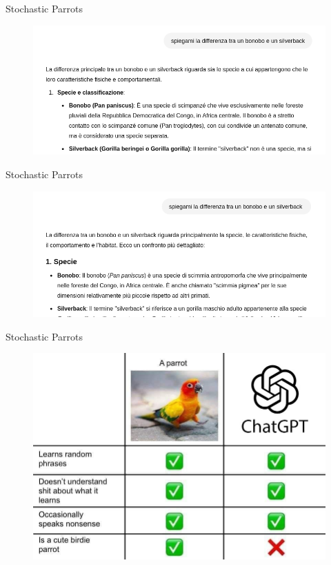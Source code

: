 \documentclass{beamer}
\begin{document}
\begin{frame}{Stochastic Parrots}
    \begin{figure}
        \includegraphics[width=1.0\linewidth]{imgs/parrot/gpt_gorilla.png}
    \end{figure}
    
\end{frame}
\begin{frame}{Stochastic Parrots}
    \begin{figure}
        \includegraphics[width=1.0\linewidth]{imgs/parrot/gpt_gorilla2.png}
    \end{figure}
\end{frame}

\begin{frame}{Stochastic Parrots}
    \begin{figure}
        \includegraphics[width=.8\linewidth]{imgs/parrot/gpt_vs_parrot2.jpg}
    \end{figure}
\end{frame}
\end{document}
